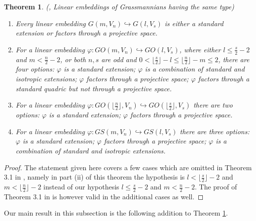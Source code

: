 \documentclass[12pt]{amsart}
\newtheorem{theorem}{Theorem}[section]
\begin{document}
\begin{theorem}\label{Theo Embed Same Type} {\rm (\cite[Theorem 3.1]{Penkov-Tikhomirov-Lin-ind-Grass}, Linear embeddings of Grassmannians having the same type)}

\begin{enumerate}
\item[\rm (i)] Every linear embedding $G(m,V_n) \hookrightarrow G(l,V_s)$ is either a standard extension or factors through a projective space.
\item[\rm (ii.1)] For a linear embedding $\varphi:GO(m,V_n) \hookrightarrow GO(l,V_s)$, where either $l\leq\frac{s}{2}-2$ and $m<\frac{n}{2}-2$, or both $n,s$ are odd and $0<\lfloor\frac{s}{2}\rfloor-l\leq \lfloor\frac{n}{2}\rfloor-m\leq2$, there are four options: $\varphi$ is a standard extension; $\varphi$ is a combination of standard and isotropic extensions; $\varphi$ factors through a projective space; $\varphi$ factors through a standard quadric but not through a projective space.
\item[\rm (ii.2)] For a linear embedding $\varphi:GO(\lfloor\frac{n}{2}\rfloor,V_{n}) \hookrightarrow GO(\lfloor\frac{s}{2}\rfloor,V_{s})$ there are two options: $\varphi$ is a standard extension; $\varphi$ factors through a projective space.
\item[\rm (iii)] For a linear embedding $\varphi:GS(m,V_n) \hookrightarrow GS(l,V_s)$ there are three options: $\varphi$ is a standard extension; $\varphi$ factors through a projective space; $\varphi$ is a combination of standard and isotropic extensions.
\end{enumerate}
\end{theorem}

\begin{proof}
The statement given here covers a few cases which are omitted in Theorem 3.1 in \cite{Penkov-Tikhomirov-Lin-ind-Grass}, namely in part (ii) of this theorem the hypothesis is $l<\lfloor\frac{s}{2}\rfloor-2$ and $m<\lfloor\frac{n}{2}\rfloor-2$ instead of our hypothesis $l\leq\frac{s}{2}-2$ and $m<\frac{n}{2}-2$. The proof of Theorem 3.1 in \cite{Penkov-Tikhomirov-Lin-ind-Grass} is however valid in the additional cases as well.
\end{proof}


Our main result in this subsection is the following addition to Theorem \ref{Theo Embed Same Type}.
\end{document}
